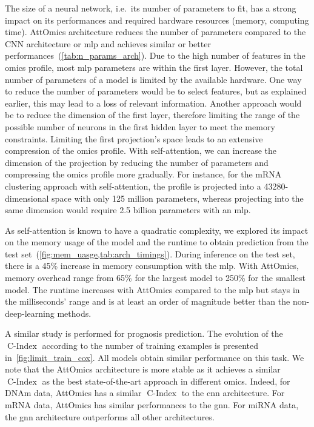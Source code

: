 \documentclass[../main.tex]{subfiles}
\begin{document}
	    The size of a neural network, i.e.\ its number of parameters to fit, has a strong impact on its performances and required hardware resources (memory, computing time).
	    AttOmics architecture reduces the number of parameters compared to the CNN architecture or \gls{mlp} and achieves similar or better performances~(\cref{tab:n_params_arch}).
	    Due to the high number of features in the omics profile, most \gls{mlp} parameters are within the first layer.
	    However, the total number of parameters of a model is limited by the available hardware.
	    One way to reduce the number of parameters would be to select features, but as explained earlier, this may lead to a loss of relevant information.
	    Another approach would be to reduce the dimension of the first layer, therefore limiting the range of the possible number of neurons in the first hidden layer to meet the memory constraints.
	    Limiting the first projection's space leads to an extensive compression of the omics profile.
	    With self-attention, we can increase the dimension of the projection by reducing the number of parameters and compressing the omics profile more gradually.
	    For instance, for the mRNA clustering approach with self-attention, the profile is projected into a 43280-dimensional space with only 125 million parameters, whereas projecting into the same dimension would require 2.5 billion parameters with an \gls{mlp}.

	    As self-attention is known to have a quadratic complexity, we explored its impact on the memory usage of the model and the runtime to obtain prediction from the test set~(\cref{fig:mem_uasge,tab:arch_timings}).
	    During inference on the test set, there is a 45\% increase in memory consumption with the \gls{mlp}.
	    With AttOmics, memory overhead range from 65\% for the largest model to 250\% for the smallest model.
	    The runtime increases with AttOmics compared to the \gls{mlp} but stays in the milliseconds' range and is at least an order of magnitude better than the non-deep-learning methods.

	    A similar study is performed for prognosis prediction.
	    The evolution of the \(\operatorname{C-Index}\) according to the number of training examples is presented in~\cref{fig:limit_train_cox}.
	    All models obtain similar performance on this task.
	    We note that the AttOmics architecture is more stable as it achieves a similar \(\operatorname{C-Index}\) as the best state-of-the-art approach in different omics.
	    Indeed, for DNAm data, AttOmics has a similar \(\operatorname{C-Index}\) to the \gls{cnn} architecture. For mRNA data, AttOmics has similar performances to the \gls{gnn}.
	    For miRNA data, the \gls{gnn} architecture outperforms all other architectures.
\end{document}
